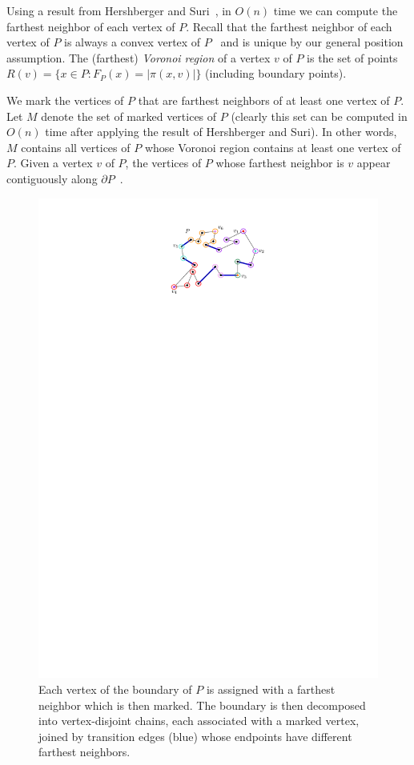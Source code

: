 \documentclass[a4paper,UKenglish]{lipics}
\newcommand{\F}[2]{\ensuremath{F_{\scriptscriptstyle #1}(#2)}}
\newcommand{\g}[2]{\ensuremath{|\pi(#1, #2)|}}
\begin{document}
Using a result from Hershberger and Suri~\cite{hershberger1993matrix}, in $O(n)$ time we can compute the farthest neighbor of each vertex of $P$.
Recall that the farthest neighbor of each vertex of $P$ is always a convex vertex of $P$~\cite{at-cgcsp-85} and is unique by our general position assumption. 
The (farthest) \emph{Voronoi region} of a vertex $v$ of $P$ is the set of points $R(v) = \{x\in P : \F{P}{x} = \g{x}{v}\}$ (including boundary points).

We mark the vertices of $P$ that are farthest neighbors of at least one vertex of $P$. Let $M$ denote the set of marked vertices of $P$ (clearly this set can be computed in $O(n)$ time after applying the result of Hershberger and Suri).
In other words, $M$ contains all vertices of $P$ whose Voronoi region contains at least one vertex of $P$.
Given a vertex $v$ of $P$, the vertices of $P$ whose farthest neighbor is $v$ appear contiguously along $\partial P$~\cite{aronov1993furthest}. \begin{figure}
\raggedleft
\includegraphics{img/MarkedVertices.pdf}
\caption{\small Each vertex of the boundary of $P$ is assigned with a farthest neighbor which is then marked. 
The boundary is then decomposed into vertex-disjoint chains, each associated with a marked vertex, joined by transition edges (blue) whose endpoints have different farthest neighbors.}
\label{fig:Marked vertices decomposition}
\end{figure}
\end{document}
